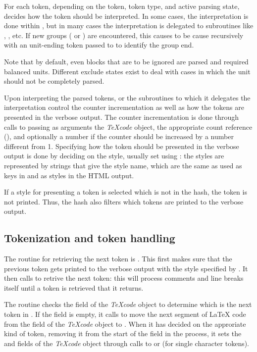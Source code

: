 \documentclass{article}
\newcommand\Obj[1]{\textsl{#1}}
\newcommand\wild{\ldots}
\begin{document}
For each token, depending on the token, token type, and active parsing state,  decides how the token should be interpreted. In some cases, the interpretation is done within , but in many cases the interpretation is delegated to subroutines like , , etc. If new groups (\code{\{\ldots\}} or ) are encountered, this causes  to be cause recursively with an unit-ending token passed to  to identify the group end.

Note that by default, even blocks that are to be ignored are parsed and required balanced units. Different exclude states exist to deal with cases in which the unit should not be completely parsed.

Upon interpreting the parsed tokens,  or the subroutines to which it delegates the interpretation control the counter incrementation as well as how the tokens are presented in the verbose output. The counter incrementation is done through calls to  passing as arguments the \Obj{TeXcode} object, the appropriate count reference (\code{\$CNT_\wild}), and optionally a number if the counter should be increased by a number different from 1. Specifying how the token should be presented in the verbose output is done by deciding on the style, usually set using : the styles are represented by strings that give the style name, which are the same as used as keys in  and as styles in the HTML output.

If a style for presenting a token is selected which is not in the  hash, the token is not printed. Thus, the  hash also filters which tokens are printed to the verbose output.


\subsection{Tokenization and token handling}

The routine for retrieving the next token is . This first makes sure that the previous token gets printed to the verbose output with the style specified by . It then calls  to retrive the next token: this will process comments and line breaks itself until a token is retrieved that it returns.

The  routine checks the  field of the \Obj{TeXcode} object to determine which is the next token in . If the  field is empty, it calls  to move the next segment of \LaTeX{} code from the  field of the \Obj{TeXcode} object to . When it has decided on the approriate kind of token, removing it from the start of the  field in the process, it sets the  and  fields of the \Obj{TeXcode} object through calls to  or  (for single character tokens).
\end{document}
